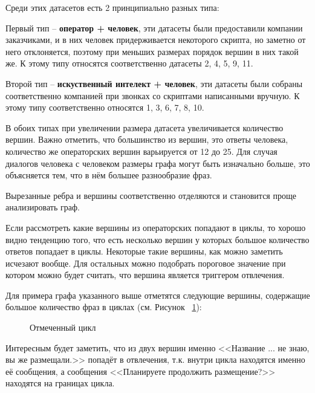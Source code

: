 \documentclass[times,specification,annotation]{itmo-student-thesis}
\begin{document}
	Среди этих датасетов есть 2 принципиально разных типа:
	
	Первый тип -- \textbf{оператор + человек}, эти датасеты были предоставили компании заказчиками, и в них человек придерживается некоторого скрипта, но заметно от него отклоняется, поэтому при меньших размерах порядок вершин в них такой же. К этому типу относятся соответственно датасеты 2, 4, 5, 9, 11.
	
	Второй тип -- \textbf{искуственный интелект + человек}, эти датасеты были собраны соответственно компанией при звонках со скриптами написанными вручную. К этому типу соответственно относятся 1, 3, 6, 7, 8, 10.
	
	В обоих типах при увеличении размера датасета увеличивается количество вершин. Важно отметить, что большинство из вершин, это ответы человека, количество же операторских вершин варьируется от 12 до 25. Для случая диалогов человека с человеком размеры графа могут быть изначально больше, это объясняется тем, что в нём большее разнообразие фраз.
	
	Вырезанные ребра и вершины соответственно отделяются и становится проще анализировать граф.
	
	Если рассмотреть какие вершины из операторских попадают в циклы, то хорошо видно тенденцию того, что есть несколько вершин у которых большое количество ответов попадает в циклы. Некоторые такие вершины, как можно заметить исчезают вообще. Для остальных можно подобрать пороговое значение при котором можно будет считать, что вершина является триггером отвлечения.
	
	Для примера графа указанного выше отметятся следующие вершины, содержащие большое количество фраз в циклах (см. Рисунок ~\ref{fig:adapt:graph:cycles}):
	
	\begin{figure}[H]
		\caption{Отмеченный цикл}
		\label{fig:adapt:graph:cycles}
	\end{figure}

	Интересным будет заметить, что из двух вершин именно <<Название ... не знаю, вы же размещали.>> попадёт в отвлечения, т.к. внутри цикла находятся именно её сообщения, а сообщения <<Планируете продолжить размещение?>> находятся на границах цикла. 
	
\end{document}

